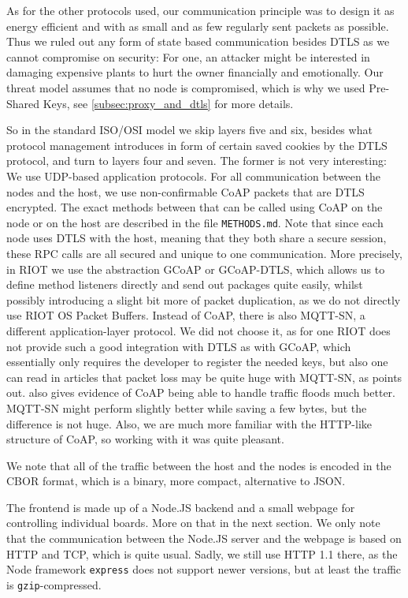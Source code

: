\documentclass[acmtog, language=english, nonacm]{acmart}
\begin{document}
    As for the other protocols used, our communication principle was to design it as energy efficient and with as small and as few regularly sent packets as possible. Thus we ruled out any form of state based communication besides DTLS as we cannot compromise on security: For one, an attacker might be interested in damaging expensive plants to hurt the owner financially and emotionally. Our threat model assumes that no node is compromised, which is why we used Pre-Shared Keys, see \cref{subsec:proxy_and_dtls} for more details.

    So in the standard ISO/OSI model we skip layers five and six, besides what protocol management introduces in form of certain saved cookies by the DTLS protocol, and turn to layers four and seven. The former is not very interesting: We use UDP-based application protocols. For all communication between the nodes and the host, we use non-confirmable CoAP packets that are DTLS encrypted. The exact methods between that can be called using CoAP on the node or on the host are described in the file \texttt{METHODS.md}. Note that since each node uses DTLS with the host, meaning that they both share a secure session, these RPC calls are all secured and unique to one communication. More precisely, in RIOT we use the abstraction GCoAP or GCoAP-DTLS, which allows us to define method listeners directly and send out packages quite easily, whilst possibly introducing a slight bit more of packet duplication, as we do not directly use RIOT OS Packet Buffers. Instead of CoAP, there is also MQTT-SN, a different application-layer protocol. We did not choose it, as for one RIOT does not provide such a good integration with DTLS as with GCoAP, which essentially only requires the developer to register the needed keys, but also one can read in articles that packet loss may be quite huge with MQTT-SN, as \cite{Waehlisch_2021} points out. \cite{Herrero_2020} also gives evidence of CoAP being able to handle traffic floods much better. MQTT-SN might perform slightly better while saving a few bytes, but the difference is not huge. Also, we are much more familiar with the HTTP-like structure of CoAP, so working with it was quite pleasant.

    We note that all of the traffic between the host and the nodes is encoded in the CBOR format, which is a binary, more compact, alternative to JSON.

    The frontend is made up of a Node.JS backend and a small webpage for controlling individual boards. More on that in the next section. We only note that the communication between the Node.JS server and the webpage is based on HTTP and TCP, which is quite usual. Sadly, we still use HTTP 1.1 there, as the Node framework \texttt{express} does not support newer versions, but at least the traffic is \texttt{gzip}-compressed.
\end{document}

